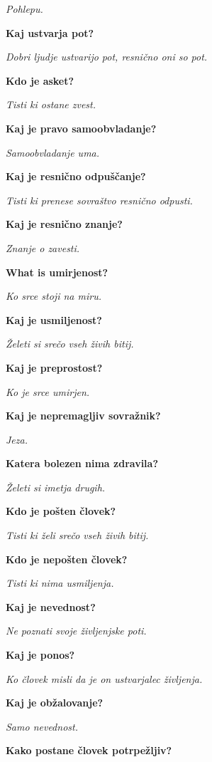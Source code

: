 \textit{Pohlepu.}\medskip 

\textbf{Kaj ustvarja pot?} 

\textit{Dobri ljudje ustvarijo pot, resnično oni so pot.}\medskip 

\textbf{Kdo je asket?} 

\textit{Tisti ki ostane zvest.}\medskip 

\textbf{Kaj je pravo samoobvladanje?} 

\textit{Samoobvladanje uma.}\medskip 

\textbf{Kaj je resnično odpuščanje?} 

\textit{Tisti ki prenese sovraštvo resnično odpusti.}\medskip 

\textbf{Kaj je resnično znanje?} 

\textit{Znanje o zavesti.}\medskip 

\textbf{What is umirjenost?} 

\textit{Ko srce stoji na miru.}\medskip 

\textbf{Kaj je usmiljenost?} 

\textit{Želeti si srečo vseh živih bitij.}\medskip 

\textbf{Kaj je preprostost?} 

\textit{Ko je srce umirjen.}\medskip 

\textbf{Kaj je nepremagljiv sovražnik?} 

\textit{Jeza.}\medskip 

\textbf{Katera bolezen nima zdravila?} 

\textit{Želeti si imetja drugih.}\medskip 

\textbf{Kdo je pošten človek?} 

\textit{Tisti ki želi srečo vseh živih bitij.}\medskip\vfill\pagebreak\vspace*{1.2cm} 

\textbf{Kdo je nepošten človek?} 

\textit{Tisti ki nima usmiljenja.}\medskip 

\textbf{Kaj je nevednost?} 

\textit{Ne poznati svoje življenjske poti.}\medskip 

\textbf{Kaj je ponos?} 

\textit{Ko človek misli da je on ustvarjalec življenja.}\medskip 

\textbf{Kaj je obžalovanje?} 

\textit{Samo nevednost.}\medskip 

\textbf{Kako postane človek potrpežljiv?} 

